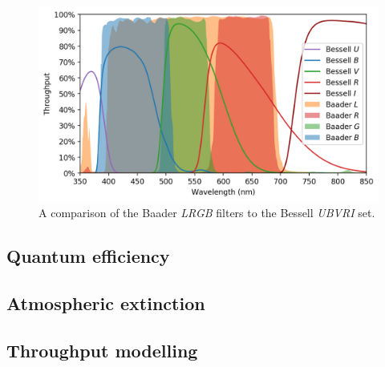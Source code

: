 \begin{colsection}
\begin{colsection}
\begin{figure}[t]
    \begin{center}
        \includegraphics[width=\textwidth]{images/throughput/filt_comp2.png}
    \end{center}
    \caption[Comparison of Baader and Bessell filters]{
        A comparison of the Baader \textit{LRGB} filters to the Bessell \textit{UBVRI} set.
    }\label{fig:filter_comparison2}
\end{figure}

\clearpage

\end{colsection}

\newpage
\subsection{Quantum efficiency}
\label{sec:qe}
\begin{colsection}


\end{colsection}

\newpage
\subsection{Atmospheric extinction}
\label{sec:atmosphere}
\begin{colsection}


\end{colsection}

\newpage
\subsection{Throughput modelling}
\label{sec:synphot}
\begin{colsection}


\end{colsection}
\end{colsection}
